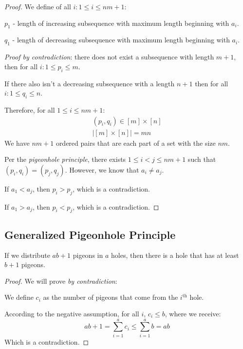 \documentclass[00_complete]{subfiles}
\begin{document}
\begin{proof}
    We define of all $i: 1 \leq i \leq nm+1$:

    $p_1$ - length of increasing subsequence with maximum length beginning with
    $a_i$.

    $q_1$ - length of decreasing subsequence with maximum length beginning with
    $a_i$.

    \emph{Proof by contradiction}: there does not exist a subsequence with length
    $m+1$, then for all $i: 1 \leq p_i \leq m$.

    If there also isn't a decreasing subsequence with a length $n+1$ then for
    all $i: 1 \leq q_i \leq n$.

    Therefore, for all $1 \leq i \leq nm+1$:
    $$
    \begin{gathered}
        (p_i,q_i) \in [m] \times [n] \\
        |[m] \times [n]| = mn
    \end{gathered}
    $$
    We have $nm+1$ ordered pairs that are each part of a set with the size
    $nm$.

    Per the \emph{pigeonhole principle}, there exists $1\leq i<j \leq nm+1$
    such that $(p_i,q_i)=(p_j,q_j)$. However, we know that $a_i \neq a_j$.

    If $a_1<a_j$, then $p_i>p_j$, which is a contradiction.

    If $a_1>a_j$, then $p_i<p_j$, which is a contradiction.
\end{proof}

\subsection{Generalized Pigeonhole Principle}

If we distribute $ab+1$ pigeons in $a$ holes, then there is a hole that has at
least $b+1$ pigeons.

\begin{proof}
    We will prove \emph{by contradiction}:

    We define $c_i$ as the number of pigeons that come from the
    $i^{\mathrm{th}}$ hole.

    According to the negative assumption, for all $i$, $c_i \leq b$, where we
    receive:
    $$ab+1=\sum_{i=1}^{a}c_i\leq \sum_{i=1}^{a}b = ab$$
    Which is a contradiction.
\end{proof}
\end{document}
